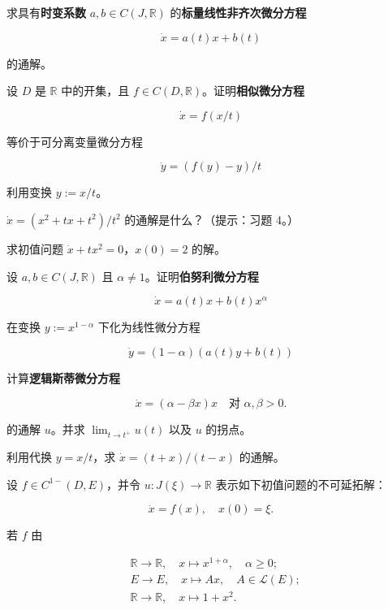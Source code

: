 \begin{exercises}
求具有\textbf{时变系数} $ a,b \in C(J,\mathbb{R}) $ 的\textbf{标量线性非齐次微分方程}

\[
\dot{x} = a(t)x + b(t)
\]

的通解。

\item

设 $ D $ 是 $ \mathbb{R} $ 中的开集，且 $ f \in C(D,\mathbb{R}) $。证明\textbf{相似微分方程}

\[
\dot{x} = f(x/t)
\]

等价于可分离变量微分方程

\[
\dot{y} = (f(y)-y)/t
\]

利用变换 $ y := x/t $。

\item

$ \dot{x} = (x^{2}+tx+t^{2})/t^{2} $ 的通解是什么？（提示：习题 4。）

\item

求初值问题 $ \dot{x}+tx^{2} = 0 $，$ x(0) = 2 $ 的解。

\item

设 $ a,b \in C(J,\mathbb{R}) $ 且 $ \alpha \ne 1 $。证明\textbf{伯努利微分方程}

\[
\dot{x} = a(t)x + b(t)x^{\alpha}
\]

在变换 $ y := x^{1-\alpha} $ 下化为线性微分方程

\[
\dot{y} = (1-\alpha)(a(t)y+b(t))
\]
\item

计算\textbf{逻辑斯蒂微分方程}

\[
\dot{x} = (\alpha-\beta x)x \quad \text{对 } \alpha,\beta > 0 .
\]

的通解 $ u $。并求 $ \lim_{t\to t^{+}} u(t) $ 以及 $ u $ 的拐点。

\item

利用代换 $ y = x/t $，求 $ \dot{x} = (t+x)/(t-x) $ 的通解。

\item

设 $ f \in C^{1-}(D,E) $，并令 $ u : J(\xi) \to \mathbb{R} $ 表示如下初值问题的不可延拓解：

\[
\dot{x} = f(x) , \quad x(0) = \xi .
\]

若 $ f $ 由

\begin{equation*}
\begin{aligned}
& \mathbb{R} \to \mathbb{R} , \quad x \mapsto x^{1+\alpha} , \quad \alpha \ge 0 ; \\ & E \to E , \quad x \mapsto Ax , \quad A \in \mathcal{L}(E) ; \\ & \mathbb{R} \to \mathbb{R} , \quad x \mapsto 1 + x^{2} .
\end{aligned}
\end{equation*}


\end{exercises}
